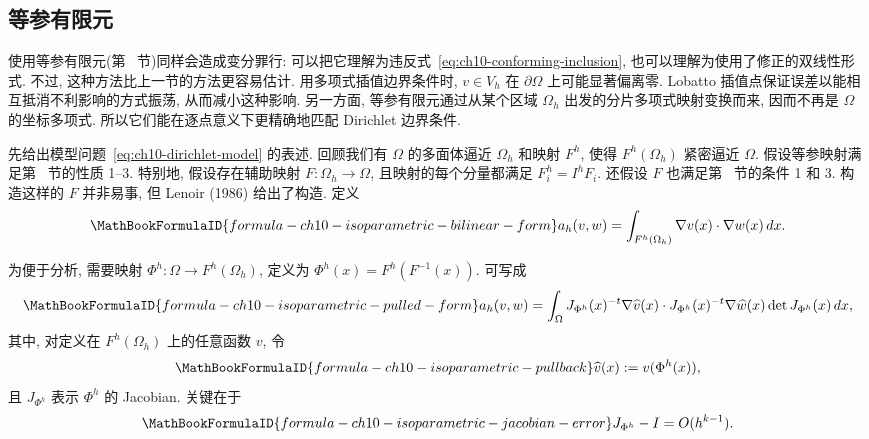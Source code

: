 \subsection{等参有限元}
\label{sec:ch10-isoparametric}
\setcounter{thmcount}{0}
\setcounter{equation}{0}

使用等参有限元(第~ 节)同样会造成变分罪行: 可以把它理解为违反式~\eqref{eq:ch10-conforming-inclusion}, 也可以理解为使用了修正的双线性形式. 不过, 这种方法比上一节的方法更容易估计. 用多项式插值边界条件时, $v\in V_h$ 在 $\partial\Omega$ 上可能显著偏离零. Lobatto 插值点保证误差以能相互抵消不利影响的方式振荡, 从而减小这种影响. 另一方面, 等参有限元通过从某个区域 $\Omega_h$ 出发的分片多项式映射变换而来, 因而不再是 $\Omega$ 的坐标多项式. 所以它们能在逐点意义下更精确地匹配 Dirichlet 边界条件.

先给出模型问题~\eqref{eq:ch10-dirichlet-model} 的表述. 回顾我们有 $\Omega$ 的多面体逼近 $\Omega_h$ 和映射 $F^h$, 使得 $F^h(\Omega_h)$ 紧密逼近 $\Omega$. 假设等参映射满足第~ 节的性质 1--3. 特别地, 假设存在辅助映射 $F:\Omega_h\to\Omega$, 且映射的每个分量都满足 $F_i^h=I^hF_i$. 还假设 $F$ 也满足第~ 节的条件 1 和 3. 构造这样的 $F$ 并非易事, 但 Lenoir (1986) 给出了构造. 定义
\[
\MathBookFormulaID{formula-ch10-isoparametric-bilinear-form}
a_h(v,w)=\int_{F^h(\Omega_h)}\nabla v(x)\cdot\nabla w(x)\,dx.
\]

为便于分析, 需要映射 $\Phi^h:\Omega\to F^h(\Omega_h)$, 定义为 $\Phi^h(x)=F^h(F^{-1}(x))$. 可写成
\[
\MathBookFormulaID{formula-ch10-isoparametric-pulled-form}
a_h(v,w)=\int_\Omega J_{\Phi^h}(x)^{-t}\nabla\widehat v(x)\cdot
J_{\Phi^h}(x)^{-t}\nabla\widehat w(x)\det J_{\Phi^h}(x)\,dx,
\]
其中, 对定义在 $F^h(\Omega_h)$ 上的任意函数 $v$, 令
\begin{equation}
\MathBookFormulaID{formula-ch10-isoparametric-pullback}
\label{eq:ch10-isoparametric-pullback}
\widehat v(x):=v(\Phi^h(x)),
\end{equation}
且 $J_{\Phi^h}$ 表示 $\Phi^h$ 的 Jacobian. 关键在于
\begin{equation}
\MathBookFormulaID{formula-ch10-isoparametric-jacobian-error}
\label{eq:ch10-isoparametric-jacobian-error}
J_{\Phi^h}-I=O(h^{k-1}).
\end{equation}

